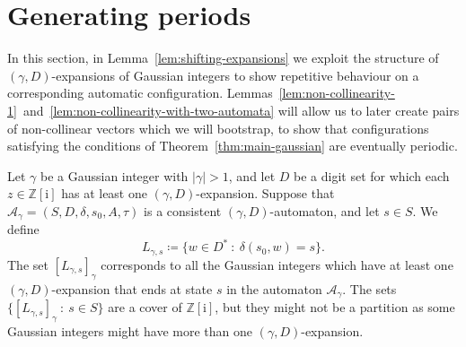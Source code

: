 \documentclass{amsart}
\newcommand{\Z}{\mathbb{Z}}
\newcommand{\ii}{\mathrm{i}}
\newtheorem*{main theorem}{Theorem \ref{thm:main-gaussian}}
\newtheorem{lemma}[theorem]{Lemma}
\newtheorem{definition}[theorem]{Definition}
\theoremstyle{definition}
\begin{document}
%
%
%
%



\section{Generating periods}\label{sec:periods-1}

In this section, in Lemma~\ref{lem:shifting-expansions} we exploit the structure of $(\gamma, D)$-expansions of Gaussian integers to show repetitive behaviour on a corresponding automatic configuration. Lemmas~\ref{lem:non-collinearity-1}~and~\ref{lem:non-collinearity-with-two-automata} will allow us to later create pairs of non-collinear vectors which we will bootstrap, to show that configurations satisfying the conditions of Theorem~\ref{thm:main-gaussian} are eventually periodic.

Let $\gamma$ be a Gaussian integer with $\lvert\gamma\rvert>1$, and let $D$ be a digit set for which each $z\in\Z[\ii]$ has at least one $(\gamma , D)$-expansion. Suppose that $\mathcal{A}_\gamma=(S,D,\delta,s_{0},A,\tau)$ is a consistent $(\gamma , D)$-automaton, and let $s\in S$. We define
    \begin{equation}\label{eq:words-ending-at-s}
        L_{\gamma,s}\coloneqq \{w\in D^*\::\: \delta(s_{0},w)=s\}.
    \end{equation}
The set $[L_{\gamma,s}]_\gamma$ corresponds to all the Gaussian integers which have at least one $(\gamma , D)$-expansion that ends at state $s$ in the automaton $\mathcal{A}_\gamma$. The sets $\{[L_{\gamma,s}]_\gamma\::\:s \in S\}$ are a cover of $\Z[\ii]$, but they might not be a partition as some Gaussian integers might have more than one $(\gamma, D)$-expansion.
\end{document}
